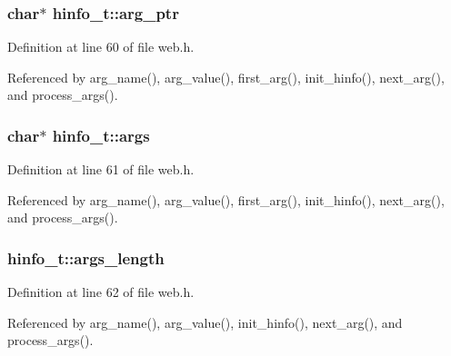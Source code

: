 \subsubsection[{\texorpdfstring{arg\+\_\+ptr}{arg_ptr}}]{\setlength{\rightskip}{0pt plus 5cm}char$\ast$ hinfo\+\_\+t\+::arg\+\_\+ptr}\hypertarget{structhinfo__t_a0d27c1b7d2730373f93342961b9cb18d}{}\label{structhinfo__t_a0d27c1b7d2730373f93342961b9cb18d}


Definition at line 60 of file web.\+h.



Referenced by arg\+\_\+name(), arg\+\_\+value(), first\+\_\+arg(), init\+\_\+hinfo(), next\+\_\+arg(), and process\+\_\+args().

\subsubsection[{\texorpdfstring{args}{args}}]{\setlength{\rightskip}{0pt plus 5cm}char$\ast$ hinfo\+\_\+t\+::args}\hypertarget{structhinfo__t_a62bf198b939a9d932bcac763ebc51443}{}\label{structhinfo__t_a62bf198b939a9d932bcac763ebc51443}


Definition at line 61 of file web.\+h.



Referenced by arg\+\_\+name(), arg\+\_\+value(), first\+\_\+arg(), init\+\_\+hinfo(), next\+\_\+arg(), and process\+\_\+args().

\subsubsection[{\texorpdfstring{args\+\_\+length}{args_length}}]{ hinfo\+\_\+t\+::args\+\_\+length}\hypertarget{structhinfo__t_a003130c9489dfe54a76df23a85fae62f}{}\label{structhinfo__t_a003130c9489dfe54a76df23a85fae62f}


Definition at line 62 of file web.\+h.



Referenced by arg\+\_\+name(), arg\+\_\+value(), init\+\_\+hinfo(), next\+\_\+arg(), and process\+\_\+args().

